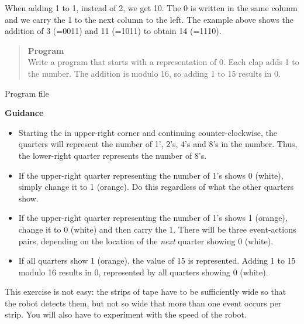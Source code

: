 When adding 1 to 1, instead of 2, we get 10. The 0 is written in the
same column and we carry the 1 to the next column to the left. The
example above shows the addition of 3 (=0011) and 11 (=1011) to obtain
14 (=1110).

\begin{quote}
\textbf{Program}\\
Write a program that starts with a representation of 0.
Each clap adds 1 to the number.
The addition is modulo 16, so adding 1 to 15 results in 0.
\end{quote}

{\raggedleft \hfill Program file }

\textbf{Guidance}

\begin{itemize}
\item Starting the in upper-right corner and continuing counter-clockwise,
the quarters will represent the number of 1', 2's, 4's and 8's in the number.
Thus, the lower-right quarter represents the number of 8's.
\item If the upper-right quarter representing the number
of 1's shows 0 (white),
simply change it to 1 (orange). Do this regardless of what the other
quarters show.
\item If the upper-right quarter representing the number of 1's
shows 1 (orange),
change it to 0 (white) and then carry the 1.
There will be three event-actions pairs,
depending on the location of the \emph{next} quarter showing 0
(white).
\item If all quarters show 1 (orange), the value of 15 is represented.
Adding 1 to 15 modulo 16 results in 0, represented by all quarters
showing 0 (white).
\end{itemize}

\bigskip


\bigskip


\bigskip

This exercise is not easy: the strips of tape have to be
sufficiently wide so that the robot detects them,
but not so wide that more than one event occurs per strip.
You will also have to experiment with the speed of the robot.

